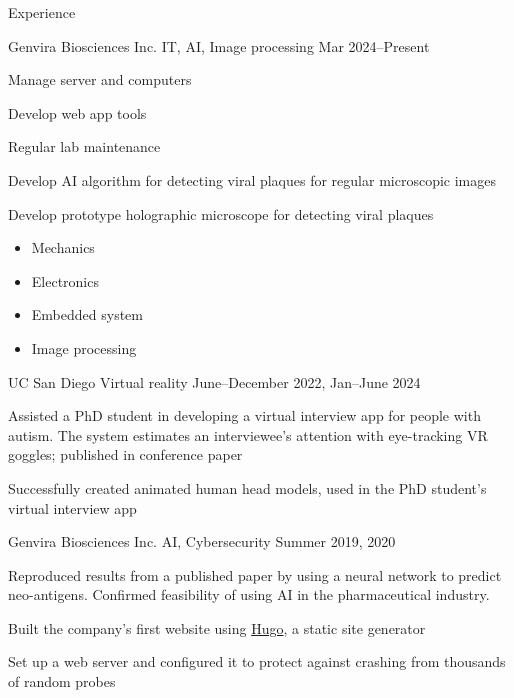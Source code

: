 	\begin{rSection}{Experience}

		\begin{rSubsection}{Genvira Biosciences Inc.} {IT, AI, Image processing} {Mar 2024--Present} %
			\begin{multicols}{3}
				\item Manage server and computers
				\item Develop web app tools
				\item Regular lab maintenance
			\end{multicols}
			\item Develop AI algorithm for detecting viral plaques for regular microscopic images
			\item Develop prototype holographic microscope for detecting viral plaques
			\begin{multicols}{4}
				\begin{itemize}
					\item Mechanics
					\item Electronics 
					\item Embedded system
					\item Image processing
				\end{itemize}
			\end{multicols}
		\end{rSubsection}

		\begin{rSubsection}{UC San Diego} {Virtual reality} {June--December 2022, Jan--June 2024} %
			\item Assisted a PhD student in developing a virtual interview app for people with autism. The system
				estimates an interviewee's attention with eye-tracking VR goggles; published in conference paper
			\item Successfully created animated human head models, used in the PhD student's virtual interview app
		\end{rSubsection}

		\begin{rSubsection}{Genvira Biosciences Inc.} {AI, Cybersecurity} {Summer 2019, 2020}
			\item Reproduced results from a published paper by using a neural network to predict neo-antigens. Confirmed feasibility of using AI in the pharmaceutical industry.
			\item Built the company's first website using \href{https://gohugo.io/}{Hugo}, a static site generator
			\item Set up a web server and configured it to protect against crashing from thousands of random probes
		\end{rSubsection}


\end{rSection}
